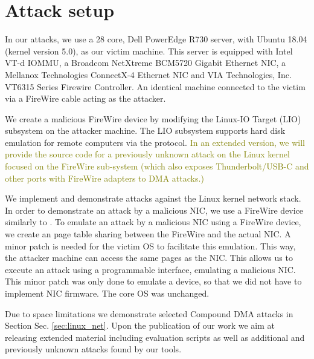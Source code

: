 \section{Attack setup}
In our attacks, we use a 28 core, Dell PowerEdge R730 server, with Ubuntu 18.04 (kernel version 5.0), as our victim machine. This server is equipped with Intel VT-d IOMMU, a Broadcom NetXtreme BCM5720 Gigabit Ethernet NIC, a Mellanox Technologies ConnectX-4 Ethernet NIC and VIA Technologies, Inc. VT6315 Series Firewire Controller. An identical machine connected to the victim via a FireWire cable acting as the attacker. 

We create a malicious FireWire device by modifying the Linux-IO Target (LIO) subsystem on the attacker machine. The LIO subsystem supports hard disk emulation for remote computers via the \spb{} protocol. \textcolor{olive}{In an extended version, we will provide the source code for a previously unknown \simple attack on the Linux kernel focused on the FireWire sub-system (which also exposes Thunderbolt/USB-C and other ports with FireWire adapters to DMA attacks.)}

We implement and demonstrate \compound attacks against the Linux kernel network stack. In order to demonstrate an attack by a malicious NIC, we use a FireWire device similarly to \cite{SLND10}. To emulate an attack by a malicious NIC using a FireWire device, we create an \iova{} page table sharing between the FireWire and the actual NIC. A minor patch is needed for the victim OS to facilitate this emulation. This way, the attacker machine can access the same pages as the NIC. This allows us to execute an attack using a programmable interface, emulating a malicious NIC. This minor patch was only done to emulate a device, so that we did not have to implement NIC firmware. The core OS was unchanged.

Due to space limitations we demonstrate selected Compound DMA attacks in Section Sec. \ref{sec:linux_net}. Upon the publication of our work we aim at releasing extended material including evaluation scripts as well as additional \compound and previously unknown \simple attacks found by our tools.